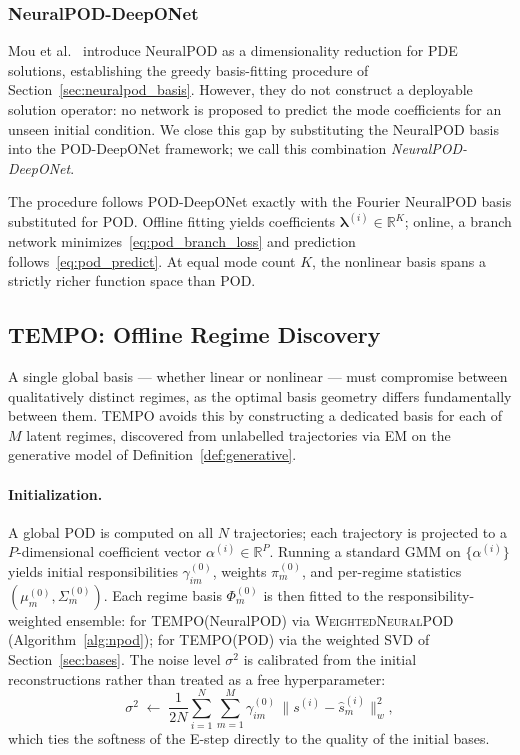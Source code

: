 \documentclass{article}
\begin{document}
\subsubsection{NeuralPOD-DeepONet}\label{sec:neuralpod_deeponet}

Mou et al.~\cite{Mou2026} introduce NeuralPOD as a dimensionality
reduction for PDE solutions, establishing the greedy basis-fitting
procedure of Section~\ref{sec:neuralpod_basis}.
However, they do not construct a deployable solution operator: no
network is proposed to predict the mode coefficients for an unseen
initial condition.
We close this gap by substituting the NeuralPOD basis into the
POD-DeepONet framework; we call this combination \emph{NeuralPOD-DeepONet}.

The procedure follows POD-DeepONet exactly with the Fourier NeuralPOD basis substituted for POD.
Offline fitting yields coefficients $\boldsymbol{\lambda}^{(i)} \in \mathbb{R}^K$; online, a branch network minimizes~\eqref{eq:pod_branch_loss} and prediction follows~\eqref{eq:pod_predict}.
At equal mode count $K$, the nonlinear basis spans a strictly richer function space than POD.


\subsection{TEMPO: Offline Regime Discovery}\label{sec:offline}


A single global basis — whether linear or nonlinear — must compromise
between qualitatively distinct regimes, as the optimal basis geometry
differs fundamentally between them.
TEMPO avoids this by constructing a dedicated basis for each of $M$
latent regimes, discovered from unlabelled trajectories via EM on
the generative model of Definition~\ref{def:generative}.

\paragraph{Initialization.}
A global POD is computed on all $N$ trajectories; each trajectory is
projected to a $P$-dimensional coefficient vector
$\alpha^{(i)} \in \mathbb{R}^P$.
Running a standard GMM on $\{\alpha^{(i)}\}$ yields initial
responsibilities $\gamma_{im}^{(0)}$, weights $\pi_m^{(0)}$,
and per-regime statistics $(\mu_m^{(0)}, \Sigma_m^{(0)})$.
Each regime basis $\Phi_m^{(0)}$ is then fitted to the
responsibility-weighted ensemble: for TEMPO(NeuralPOD) via
\textsc{WeightedNeuralPOD} (Algorithm~\ref{alg:npod}); for TEMPO(POD)
via the weighted SVD of Section~\ref{sec:bases}.
The noise level $\sigma^2$ is calibrated from the initial
reconstructions rather than treated as a free hyperparameter:
\begin{equation}
  \sigma^2 \;\leftarrow\;
  \frac{1}{2N}\sum_{i=1}^N\sum_{m=1}^M
  \gamma_{im}^{(0)}\,\bigl\|s^{(i)} - \hat{s}_m^{(i)}\bigr\|_w^2,
  \label{eq:sigma2_calib}
\end{equation}
which ties the softness of the E-step directly to the quality of the
initial bases.
\end{document}
